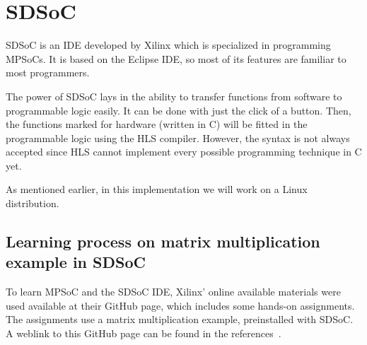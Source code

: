 \section{SDSoC}

SDSoC is an IDE developed by Xilinx which is specialized in programming MPSoCs. It is based on the Eclipse IDE, so most of its features are familiar to most programmers. 

The power of SDSoC lays in the ability to transfer functions from software to programmable logic easily. It can be done with just the click of a button. Then, the functions marked for hardware (written in C) will be fitted in the programmable logic using the HLS compiler. However, the syntax is not always accepted since HLS cannot implement every possible programming technique in C yet.

As mentioned earlier, in this implementation we will work on a Linux distribution.

\subsection{Learning process on matrix multiplication example in SDSoC}

To learn MPSoC and the SDSoC IDE, Xilinx' online available materials were used available at their GitHub page, which includes some hands-on assignments. The assignments use a matrix multiplication example, preinstalled with SDSoC. A weblink to this GitHub page can be found in the references~\cite{sdsoc}.

